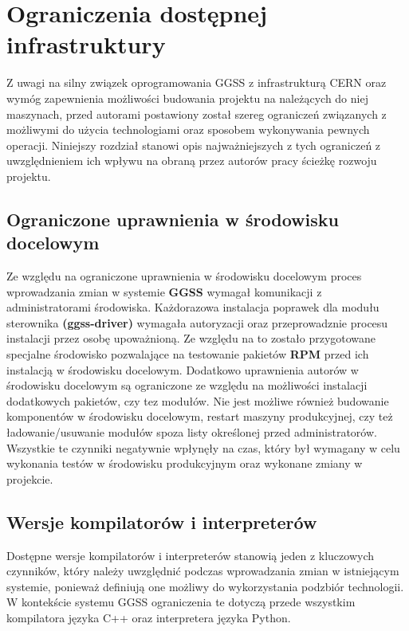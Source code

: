 
\chapter{Ograniczenia dostępnej infrastruktury}
\label{cha:ogra}
Z uwagi na silny związek oprogramowania GGSS z infrastrukturą CERN oraz wymóg zapewnienia możliwości budowania projektu na należących do niej maszynach, przed autorami postawiony został szereg ograniczeń związanych z możliwymi do użycia technologiami oraz sposobem wykonywania pewnych operacji. Niniejszy rozdział stanowi opis najważniejszych z tych ograniczeń z uwzględnieniem ich wpływu na obraną przez autorów pracy ścieżkę rozwoju projektu.


\section{Ograniczone uprawnienia w środowisku docelowym}
Ze względu na ograniczone uprawnienia w środowisku docelowym proces wprowadzania zmian w systemie \textbf{GGSS} wymagał komunikacji z administratorami środowiska. Każdorazowa instalacja poprawek dla modułu sterownika \textbf{(ggss-driver)} wymagała autoryzacji oraz przeprowadznie procesu instalacji przez osobę upoważnioną. Ze względu na to zostało przygotowane specjalne środowisko pozwalające na testowanie pakietów \textbf{RPM} przed ich instalacją w środowisku docelowym. Dodatkowo uprawnienia autorów w środowisku docelowym są ograniczone ze względu na możliwości instalacji dodatkowych pakietów, czy tez modułów. Nie jest możliwe również budowanie komponentów w środowisku docelowym, restart maszyny produkcyjnej, czy też ładowanie/usuwanie modułów spoza listy określonej przed administratorów. Wszystkie te czynniki negatywnie wpłynęły na czas, który był wymagany w celu wykonania testów w środowisku produkcyjnym oraz wykonane zmiany w projekcie.


\section{Wersje kompilatorów i interpreterów}
Dostępne wersje kompilatorów i interpreterów stanowią jeden z kluczowych czynników, który należy uwzględnić podczas wprowadzania zmian w istniejącym systemie, ponieważ definiują one możliwy do wykorzystania podzbiór technologii. W kontekście systemu GGSS ograniczenia te dotyczą przede wszystkim kompilatora języka C++ oraz interpretera języka Python. 

